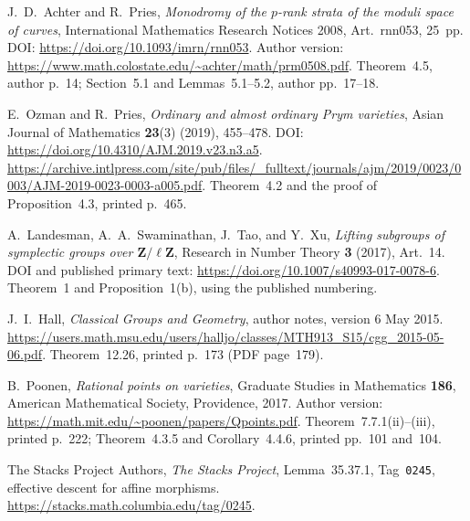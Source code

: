 J.~D.~Achter and R.~Pries,
\emph{Monodromy of the $p$-rank strata of the moduli space of curves},
International Mathematics Research Notices 2008,
Art.~rnn053, 25~pp.
DOI: \url{https://doi.org/10.1093/imrn/rnn053}.
Author version:
\url{https://www.math.colostate.edu/~achter/math/prm0508.pdf}.
Theorem~4.5, author p.~14; Section~5.1 and Lemmas~5.1--5.2,
author pp.~17--18.

E.~Ozman and R.~Pries,
\emph{Ordinary and almost ordinary Prym varieties},
Asian Journal of Mathematics \textbf{23}(3) (2019), 455--478.
DOI: \url{https://doi.org/10.4310/AJM.2019.v23.n3.a5}.
\url{https://archive.intlpress.com/site/pub/files/_fulltext/journals/ajm/2019/0023/0003/AJM-2019-0023-0003-a005.pdf}.
Theorem~4.2 and the proof of Proposition~4.3, printed p.~465.

A.~Landesman, A.~A.~Swaminathan, J.~Tao, and Y.~Xu,
\emph{Lifting subgroups of symplectic groups over
$\mathbf Z/\ell\mathbf Z$},
Research in Number Theory \textbf{3} (2017), Art.~14.
DOI and published primary text:
\url{https://doi.org/10.1007/s40993-017-0078-6}.
Theorem~1 and Proposition~1(b), using the published numbering.

J.~I.~Hall, \emph{Classical Groups and Geometry},
author notes, version 6 May 2015.
\url{https://users.math.msu.edu/users/halljo/classes/MTH913_S15/cgg_2015-05-06.pdf}.
Theorem~12.26, printed p.~173 (PDF page~179).

B.~Poonen, \emph{Rational points on varieties},
Graduate Studies in Mathematics \textbf{186},
American Mathematical Society, Providence, 2017.
Author version: \url{https://math.mit.edu/~poonen/papers/Qpoints.pdf}.
Theorem~7.7.1(ii)--(iii), printed p.~222;
Theorem~4.3.5 and Corollary~4.4.6, printed pp.~101 and~104.

The Stacks Project Authors,
\emph{The Stacks Project}, Lemma~35.37.1,
Tag~\texttt{0245}, effective descent for affine morphisms.
\url{https://stacks.math.columbia.edu/tag/0245}.

